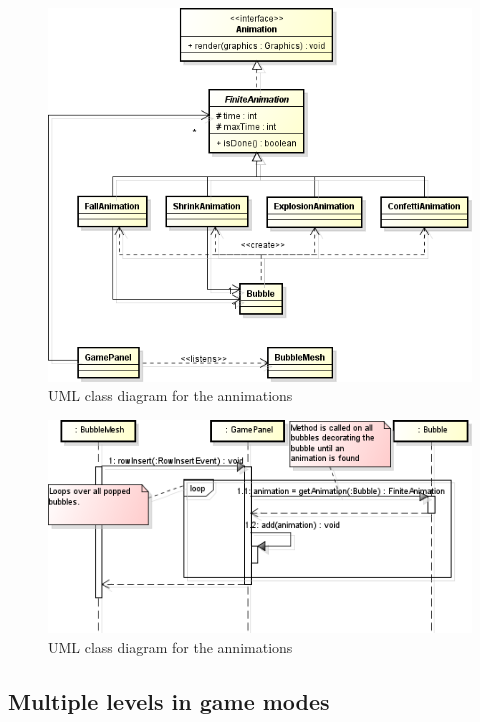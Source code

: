 \documentclass[a4paper]{article}
\begin{document}
\begin{figure}[H]
	\centering
	\includegraphics[scale=0.4]{newAnimationClassDiagram.png}
    \caption{UML class diagram for the annimations }
    \label{fig:newAnimationClassDiagram}
\end{figure}
\begin{figure}[H]
	\centering
	\includegraphics[scale=0.8]{addPopAnimations.png}
    \caption{UML class diagram for the annimations }
    \label{fig:addPopAnimations}
\end{figure}

\subsection{Multiple levels in game modes}
\end{document}
